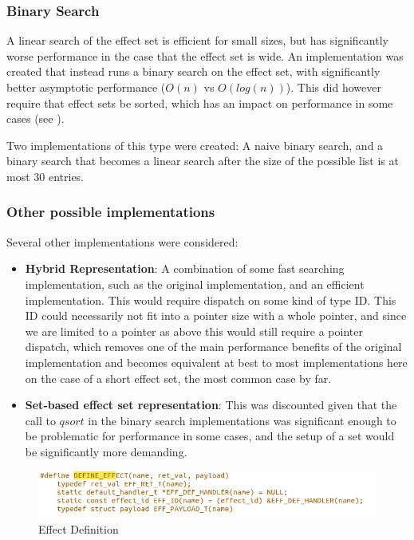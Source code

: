 \documentclass[logo,bsc,singlespacing,parskip,online]{infthesis}
\begin{document}
\subsubsection{Binary Search}

A linear search of the effect set is efficient for small sizes, but has significantly worse performance in the case that the effect set is wide. An implementation was created that instead runs a binary search on the effect set, with significantly better asymptotic performance ($O(n)$ vs $O(log(n))$). This did however require that effect sets be sorted, which has an impact on performance in some cases (see ).

Two implementations of this type were created: A naive binary search, and a binary search that becomes a linear search after the size of the possible list is at most 30 entries.

\subsubsection{Other possible implementations}

Several other implementations were considered:
\begin{itemize}
    \item \textbf{Hybrid Representation}: A combination of some fast searching implementation, such as the original implementation, and an efficient implementation. This would require dispatch on some kind of type ID. This ID could necessarily not fit into a pointer size with a whole pointer, and since we are limited to a pointer as above this would still require a pointer dispatch, which removes one of the main performance benefits of the original implementation and becomes equivalent at best to most implementations here on the case of a short effect set, the most common case by far.
    \item \textbf{Set-based effect set representation}: This was discounted given that the call to $qsort$ in the binary search implementations was significant enough to be problematic for performance in some cases, and the setup of a set would be significantly more demanding.
\end{itemize}

\begin{figure}[ht]
    \centering
    \includegraphics[width=1\linewidth]{defeff.png}
    \caption{Effect Definition}
    \label{fig:joooo}
\end{figure}
\end{document}
